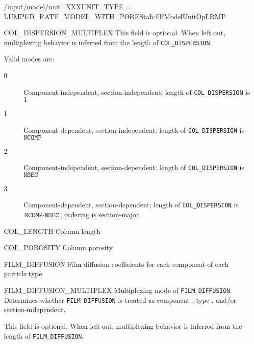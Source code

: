 \begin{condsubgroup}{/input/model/unit\_XXX}{UNIT\_TYPE = LUMPED\_RATE\_MODEL\_WITH\_PORES}{tab:FFModelUnitOpLRMP}
\begin{dataset}[unit=--,type=int,range={$\{0, \dots, 3 \}$},length={1}]{COL\_DISPERSION\_MULTIPLEX}
    This field is optional.
    When left out, multiplexing behavior is inferred from the length of \texttt{COL\_DISPERSION}.

    Valid modes are:
    \begin{description}
      \item[0] Component-independent, section-independent; length of \texttt{COL\_DISPERSION} is $1$
      \item[1] Component-dependent, section-independent; length of \texttt{COL\_DISPERSION} is $\texttt{NCOMP}$
      \item[2] Component-independent, section-dependent; length of \texttt{COL\_DISPERSION} is $\texttt{NSEC}$
      \item[3] Component-dependent, section-dependent; length of \texttt{COL\_DISPERSION} is $\texttt{NCOMP} \cdot \texttt{NSEC}$; ordering is section-major
    \end{description}\vspace{-\baselineskip}
  \end{dataset}
  \begin{dataset}[unit=\si{\metre},type=double,range={$> 0$},length={1}]{COL\_LENGTH}
    Column length
  \end{dataset}
  \begin{dataset}[unit=--,type=double,range={$(0,1]$},length={1}]{COL\_POROSITY}
    Column porosity
  \end{dataset}
  \begin{dataset}[unit=\si{\metre\per\second},type=double,range={$\geq 0$},length={see \texttt{FILM\_DIFFUSION\_MULTIPLEX}}]{FILM\_DIFFUSION}
    Film diffusion coefficients for each component of each particle type
  \end{dataset}
  \begin{dataset}[unit=--,type=int,range={$\{0, \dots, 3 \}$},length={1}]{FILM\_DIFFUSION\_MULTIPLEX}
    Multiplexing mode of \texttt{FILM\_DIFFUSION}.
    Determines whether \texttt{FILM\_DIFFUSION} is treated as component-, type-, and/or section-independent.

    This field is optional.
    When left out, multiplexing behavior is inferred from the length of \texttt{FILM\_DIFFUSION}.


\end{dataset}
\end{condsubgroup}
